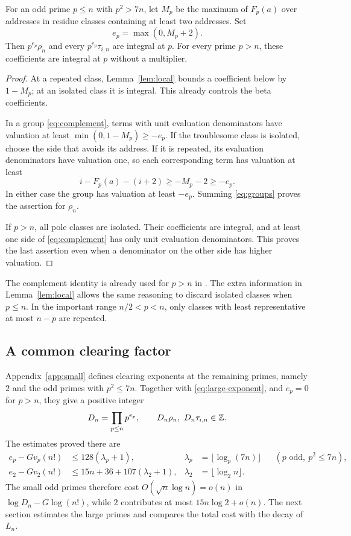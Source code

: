 \begin{proposition}\label{prop:isolated}
For an odd prime $p\le n$ with $p^2>7n$, let $M_p$ be the maximum
of $F_p(a)$ over addresses in residue classes containing at least
two addresses. Set
\begin{equation}\label{eq:large-exponent}
 e_p=\max(0,M_p+2).
\end{equation}
Then $p^{e_p}\rho_n$ and every $p^{e_p}\tau_{i,n}$ are integral
at $p$. For every prime $p>n$, these coefficients are integral at
$p$ without a multiplier.
\end{proposition}
\begin{proof}
At a repeated class, Lemma~\ref{lem:local} bounds a coefficient
below by $1-M_p$; at an isolated class it is integral. This already
controls the beta coefficients.

In a group \eqref{eq:complement}, terms with unit evaluation
denominators have valuation at least $\min(0,1-M_p)\ge-e_p$.
If the troublesome class is isolated, choose the side that avoids
its address. If it is repeated, its evaluation denominators have
valuation one, so each corresponding term has valuation at least
\[
 i-F_p(a)-(i+2)\ge-M_p-2\ge-e_p.
\]
In either case the group has valuation at least $-e_p$. Summing
\eqref{eq:groups} proves the assertion for $\rho_n$.

If $p>n$, all pole classes are isolated. Their coefficients are
integral, and at least one side of \eqref{eq:complement} has only
unit evaluation denominators. This proves the last assertion even
when a denominator on the other side has higher valuation.
\end{proof}

The complement identity is already used for $p>n$ in
\cite[Lemma 4.6]{krisman}. The extra information in
Lemma~\ref{lem:local} allows the same reasoning to discard isolated
classes when $p\le n$. In the important range $n/2<p<n$, only
classes with least representative at most $n-p$ are repeated.

\subsection{A common clearing factor}
Appendix~\ref{app:small} defines clearing exponents at the remaining
primes, namely $2$ and the odd primes with $p^2\le7n$. Together with
\eqref{eq:large-exponent}, and $e_p=0$ for $p>n$, they give a
positive integer
\begin{equation}\label{eq:Dn}
 D_n=\prod_{p\le n}p^{e_p},\qquad
 D_n\rho_n,\ D_n\tau_{i,n}\in\mathbb Z.
\end{equation}
The estimates proved there are
\begin{align}
 e_p-Gv_p(n!)&\le128(\lambda_p+1),
 &\lambda_p&=\lfloor\log_p(7n)\rfloor
 &&(p\text{ odd},\ p^2\le7n),                 \label{eq:small-cost}\\
 e_2-Gv_2(n!)&\le15n+36+107(\lambda_2+1),
 &\lambda_2&=\lfloor\log_2n\rfloor.           \label{eq:two-cost}
\end{align}
The small odd primes therefore cost $O(\sqrt n\log n)=o(n)$ in
$\log D_n-G\log(n!)$, while $2$ contributes at most
$15n\log2+o(n)$. The next section estimates the large primes and
compares the total cost with the decay of $L_n$.
